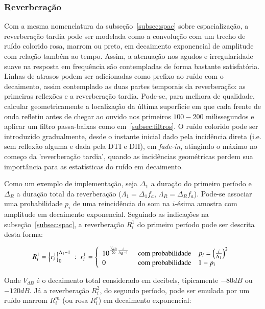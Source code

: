 \subsubsection{Reverberação}\label{subsubsec:reverb}
Com a mesma nomenclatura da subseção~\ref{subsec:spac} sobre espacialização, a reverberação tardia pode ser modelada como a convolução com um trecho de ruído colorido rosa, marrom ou preto, em decaimento exponencial de amplitude com relação também ao tempo. Assim, a atenuação nos agudos e irregularidade suave na resposta em frequência são contempladas de forma bastante satisfatória.\cite{JOSPhy,guillaume} Linhas de atrasos podem ser adicionadas como prefixo ao ruído com o decaimento, assim contemplado as duas partes temporais da reverberação: as primeiras reflexões e a reverberação tardia. Pode-se, para melhora de qualidade, calcular geometricamente a localização da última superfície em que cada frente de onda refletiu antes de chegar ao ouvido nos primeiros $100-200$ milissegundos e aplicar um filtro passa-baixas como em~\ref{subsec:filtros}. O ruído colorido pode ser introduzido gradualmente, desde o instante inicial dado pela incidência direta (i.e. sem reflexão alguma e dada pela DTI e DII), em \emph{fade-in}, atingindo o máximo no começo da 'reverberação tardia', quando as incidências geométricas perdem sua importância para as estatísticas do ruído em decaimento.

Como um exemplo de implementação, seja $\Delta_1$ a duração do primeiro período e $\Delta_R$ a duração total da reverberação ($\Lambda_1=\Delta_1 f_a$, $\Lambda_R=\Delta_R f_a$). Pode-se
associar uma probabilidade $p_i$ de uma reincidência do som na $i$-ésima amostra com amplitude em decaimento exponencial. Seguindo
as indicações na subseção~\ref{subsec:spac}, a reverberação $R_i^1$ do primeiro período pode ser descrita desta forma:

\begin{equation}\label{eq:p1rev}
    R_i^1=\left\{r_i^1\right\}_0^{\Lambda_1-1}\;:\;r_i^1=\left\{
        \begin{array}{l l}
            10^{\frac{V_{dB}}{20}\frac{i}{\Lambda_R-1}}\;  & \text{com probabilidade}\quad p_i=\left(\frac{i}{\Lambda_1}\right)^2 \\
                                     0 \; & \text{com probabilidade}\quad 1-p_i \\
        \end{array} \right.
\end{equation}

Onde $V_{dB}$ é o decaimento total considerado em decibels, tipicamente $-80dB$ ou $-120dB$.   Já a reverberação $R_i^2$, do segundo período, pode ser emulada por um ruído marrom $R_i^m$ (ou rosa $R_i^r$) em decaimento exponencial: 

